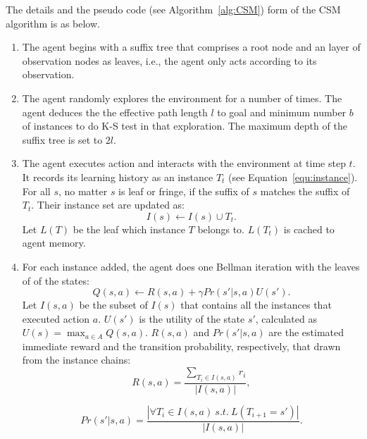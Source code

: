 \documentclass{article}
\begin{document}
The details and the pseudo code (see Algorithm~\ref{alg:CSM}) form of the CSM algorithm is as below.

\begin{enumerate}

  \item The agent begins with a suffix tree that comprises a root node and an layer of
  observation nodes as leaves, i.e., the agent only acts according to its observation.

  \item The agent randomly explores the environment for a number of times. The agent deduces the
  the effective path length $l$ to goal and minimum number $b$ of instances to do K-S test
  in that exploration. The maximum depth of the suffix tree is set to $2l$.

  \item The agent executes action and interacts with the environment at time step $t$.
  It records its learning history as an instance $T_t$ (see Equation~\ref{equ:instance}).
  For all $s$, no matter $s$ is leaf or fringe, if the suffix of $s$ matches the suffix of
  $T_t$. Their instance set are updated as:
    \begin{equation}
      I(s) \leftarrow I(s) \cup {T_t}.
    \end{equation}
  Let $L(T)$ be the leaf which instance $T$ belongs to. $L(T_t)$ is cached to agent memory.

  \item For each instance added, the agent does one Bellman iteration with the leaves of
  of the states:
    \begin{equation}
      Q(s,a) \leftarrow R(s,a)  + \gamma Pr(s'|s,a)U(s').
    \end{equation}
  Let $I(s,a)$ be the subset of $I(s)$ that contains all the instances that executed
  action $a$. $U(s')$ is the utility of the state $s'$, calculated as
  $U(s) = \max_{a \in A} Q(s,a)$. $R(s,a)$ and $Pr(s'|s,a)$ are the estimated immediate
  reward and the transition probability, respectively, that drawn from the instance chains:
    \begin{equation}
      R(s,a) = \frac{\sum_{T_i \in I(s,a)}r_i} {|I(s,a)|},
    \end{equation}

    \begin{equation}
      Pr(s'|s,a) = \frac{|\forall{T_i \in I(s,a) \ s.t. \ L(T_{i+1} = s')}|} {|I(s,a)|}.
    \end{equation}
  

\end{enumerate}
\end{document}
